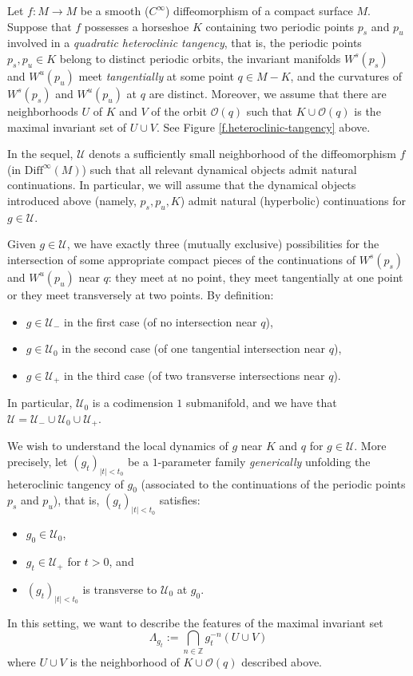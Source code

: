 \documentclass[12pt]{amsart}
\numberwithin{equation}{section}
\theoremstyle{definition}
\newcommand{\<}{{\langle}}
\renewcommand{\>}{{\rangle}}
\begin{document}
Let $f:M\to M$ be a smooth ($C^{\infty}$) diffeomorphism of a compact surface $M$. Suppose that $f$ possesses a horseshoe $K$ containing two periodic points $p_s$ and $p_u$ involved in a \emph{quadratic heteroclinic tangency}, that is, the periodic points $p_s, p_u\in K$ belong to distinct periodic orbits, the invariant manifolds $W^s(p_s)$ and $W^u(p_u)$ meet \emph{tangentially} at some point $q\in M-K$, and the curvatures of $W^s(p_s)$ and $W^u(p_u)$ at $q$ are distinct. Moreover, we assume that there are neighborhoods $U$ of $K$ and $V$ of the orbit $\mathcal{O}(q)$ such that $K\cup\mathcal{O}(q)$ is the maximal invariant set of $U\cup V$. See Figure \ref{f.heteroclinic-tangency} above. 

In the sequel, $\mathcal{U}$ denots a sufficiently small neighborhood of the diffeomorphism $f$ (in $\textrm{Diff}^{\infty}(M)$) such that all relevant dynamical objects admit natural continuations. In particular, we will assume that the dynamical objects introduced above (namely, $p_s, p_u, K$) admit natural (hyperbolic) continuations for $g\in\mathcal{U}$.

Given $g\in\mathcal{U}$, we have exactly three (mutually exclusive) possibilities for the intersection of some appropriate compact pieces of the continuations of $W^s(p_s)$ and $W^u(p_u)$ near $q$: they meet at no point, they meet tangentially at one point or they meet transversely at two points. By definition: 
\begin{itemize}
\item $g\in\mathcal{U}_-$ in the first case (of no intersection near $q$), 
\item $g\in\mathcal{U}_0$ in the second case (of one tangential intersection near $q$), 
\item $g\in\mathcal{U}_+$ in the third case (of two transverse intersections near $q$).
\end{itemize}
In particular, $\mathcal{U}_0$ is a codimension $1$ submanifold, and we have that $\mathcal{U}=\mathcal{U}_-\cup\mathcal{U}_0\cup\mathcal{U}_+$. 

We wish to understand the local dynamics of $g$ near $K$ and $q$ for $g\in\mathcal{U}$. More precisely,  let $(g_t)_{|t|<t_0}$ be a $1$-parameter family \emph{generically} unfolding the heteroclinic tangency of $g_0$ (associated to the continuations of the periodic points $p_s$ and $p_u$), that is, $(g_t)_{|t|<t_0}$ satisfies: 
\begin{itemize}
\item $g_0\in\mathcal{U}_0$,  
\item $g_t\in\mathcal{U}_+$ for $t>0$, and
\item $(g_t)_{|t|<t_0}$ is transverse to $\mathcal{U}_0$ at $g_0$.
\end{itemize}
In this setting, we want to describe the features of the maximal invariant set 
\begin{equation}\label{e.Lambda-g}
\Lambda_{g_t}:= \bigcap\limits_{n\in\mathbb{Z}} g_t^{-n}(U\cup V)
\end{equation}
where $U\cup V$ is the neighborhood of $K\cup\mathcal{O}(q)$ described above.  
\end{document}
